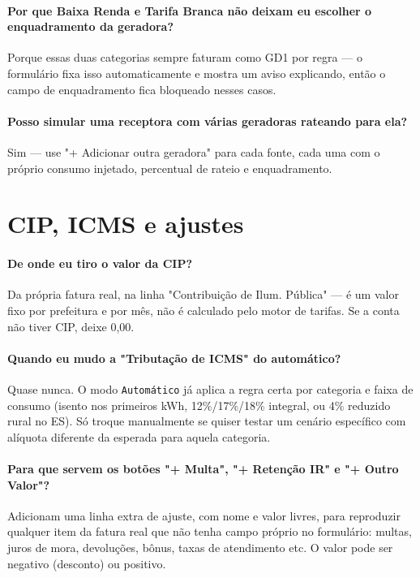 \documentclass[11pt,a4paper]{article}
\newcommand{\campo}[1]{\texttt{\small #1}}
\begin{document}
\paragraph{Por que Baixa Renda e Tarifa Branca não deixam eu escolher o enquadramento da geradora?}
Porque essas duas categorias sempre faturam como GD1 por regra --- o formulário fixa isso automaticamente e mostra um aviso explicando, então o campo de enquadramento fica bloqueado nesses casos.

\paragraph{Posso simular uma receptora com várias geradoras rateando para ela?}
Sim --- use "+ Adicionar outra geradora" para cada fonte, cada uma com o próprio consumo injetado, percentual de rateio e enquadramento.

\section{CIP, ICMS e ajustes}

\paragraph{De onde eu tiro o valor da CIP?}
Da própria fatura real, na linha "Contribuição de Ilum. Pública" --- é um valor fixo por prefeitura e por mês, não é calculado pelo motor de tarifas. Se a conta não tiver CIP, deixe 0,00.

\paragraph{Quando eu mudo a "Tributação de ICMS" do automático?}
Quase nunca. O modo \campo{Automático} já aplica a regra certa por categoria e faixa de consumo (isento nos primeiros kWh, 12\%/17\%/18\% integral, ou 4\% reduzido rural no ES). Só troque manualmente se quiser testar um cenário específico com alíquota diferente da esperada para aquela categoria.

\paragraph{Para que servem os botões "+ Multa", "+ Retenção IR" e "+ Outro Valor"?}
Adicionam uma linha extra de ajuste, com nome e valor livres, para reproduzir qualquer item da fatura real que não tenha campo próprio no formulário: multas, juros de mora, devoluções, bônus, taxas de atendimento etc. O valor pode ser negativo (desconto) ou positivo.
\end{document}
